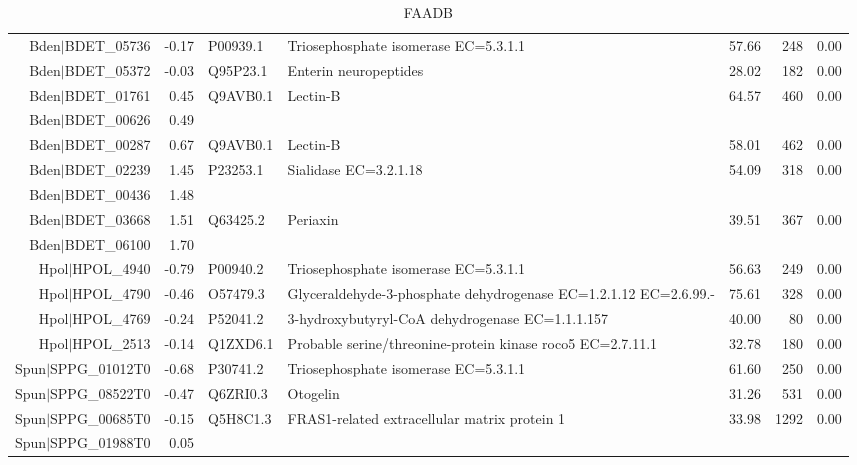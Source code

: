 \begin{table}[tbp]
\begin{tabular}{rrllrrr}
  Bden$|$BDET\_05736 & -0.17 & P00939.1 & Triosephosphate isomerase EC=5.3.1.1 & 57.66 & 248 & 0.00 \\ 
  Bden$|$BDET\_05372 & -0.03 & Q95P23.1 & Enterin neuropeptides & 28.02 & 182 & 0.00 \\ 
  Bden$|$BDET\_01761 & 0.45 & Q9AVB0.1 & Lectin-B & 64.57 & 460 & 0.00 \\ 
  Bden$|$BDET\_00626 & 0.49 &  &  &  &  &  \\ 
  Bden$|$BDET\_00287 & 0.67 & Q9AVB0.1 & Lectin-B & 58.01 & 462 & 0.00 \\ 
  Bden$|$BDET\_02239 & 1.45 & P23253.1 & Sialidase EC=3.2.1.18 & 54.09 & 318 & 0.00 \\ 
  Bden$|$BDET\_00436 & 1.48 &  &  &  &  &  \\ 
  Bden$|$BDET\_03668 & 1.51 & Q63425.2 & Periaxin & 39.51 & 367 & 0.00 \\ 
  Bden$|$BDET\_06100 & 1.70 &  &  &  &  &  \\ 
  Hpol$|$HPOL\_4940 & -0.79 & P00940.2 & Triosephosphate isomerase EC=5.3.1.1 & 56.63 & 249 & 0.00 \\ 
  Hpol$|$HPOL\_4790 & -0.46 & O57479.3 & Glyceraldehyde-3-phosphate dehydrogenase EC=1.2.1.12 EC=2.6.99.- & 75.61 & 328 & 0.00 \\ 
  Hpol$|$HPOL\_4769 & -0.24 & P52041.2 & 3-hydroxybutyryl-CoA dehydrogenase EC=1.1.1.157 & 40.00 &  80 & 0.00 \\ 
  Hpol$|$HPOL\_2513 & -0.14 & Q1ZXD6.1 & Probable serine/threonine-protein kinase roco5 EC=2.7.11.1 & 32.78 & 180 & 0.00 \\ 
  Spun$|$SPPG\_01012T0 & -0.68 & P30741.2 & Triosephosphate isomerase EC=5.3.1.1 & 61.60 & 250 & 0.00 \\ 
  Spun$|$SPPG\_08522T0 & -0.47 & Q6ZRI0.3 & Otogelin & 31.26 & 531 & 0.00 \\ 
  Spun$|$SPPG\_00685T0 & -0.15 & Q5H8C1.3 & FRAS1-related extracellular matrix protein 1 & 33.98 & 1292 & 0.00 \\ 
  Spun$|$SPPG\_01988T0 & 0.05 &  &  &  &  &  \\ 
   \hline
\end{tabular}
\caption{FAADB} 
\label{tab:ChClat_FAADB}
\end{table}

